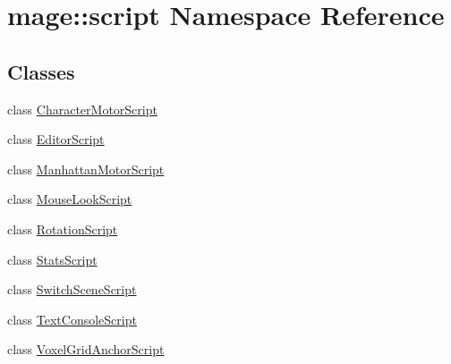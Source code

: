 \hypertarget{namespacemage_1_1script}{}\section{mage\+:\+:script Namespace Reference}
\label{namespacemage_1_1script}
\subsection*{Classes}
\begin{DoxyCompactItemize}
\item 
class \mbox{\hyperlink{classmage_1_1script_1_1_character_motor_script}{Character\+Motor\+Script}}
\item 
class \mbox{\hyperlink{classmage_1_1script_1_1_editor_script}{Editor\+Script}}
\item 
class \mbox{\hyperlink{classmage_1_1script_1_1_manhattan_motor_script}{Manhattan\+Motor\+Script}}
\item 
class \mbox{\hyperlink{classmage_1_1script_1_1_mouse_look_script}{Mouse\+Look\+Script}}
\item 
class \mbox{\hyperlink{classmage_1_1script_1_1_rotation_script}{Rotation\+Script}}
\item 
class \mbox{\hyperlink{classmage_1_1script_1_1_stats_script}{Stats\+Script}}
\item 
class \mbox{\hyperlink{classmage_1_1script_1_1_switch_scene_script}{Switch\+Scene\+Script}}
\item 
class \mbox{\hyperlink{classmage_1_1script_1_1_text_console_script}{Text\+Console\+Script}}
\item 
class \mbox{\hyperlink{classmage_1_1script_1_1_voxel_grid_anchor_script}{Voxel\+Grid\+Anchor\+Script}}
\end{DoxyCompactItemize}
